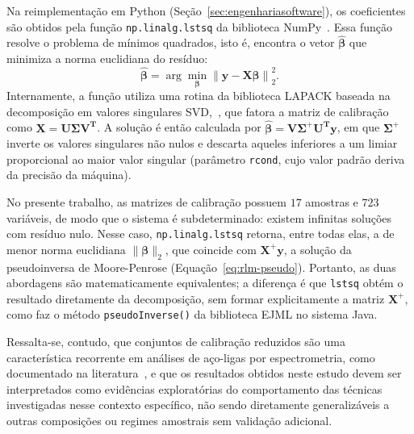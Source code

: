 Na reimplementação em Python (Seção~\ref{sec:engenhariasoftware}), os coeficientes são obtidos pela função \texttt{np.linalg.lstsq} da biblioteca NumPy~\cite{harris2020numpy,numpy_lstsq}. Essa função resolve o problema de mínimos quadrados, isto é, encontra o vetor $\widehat{\boldsymbol{\beta}}$ que minimiza a norma euclidiana do resíduo:
\begin{equation}
    \label{eq:lstsq-min}
    \widehat{\boldsymbol{\beta}} = \arg\min_{\boldsymbol{\beta}}
    \left\lVert \mathbf{y} - \mathbf{X}\boldsymbol{\beta} \right\rVert_2^2 .
\end{equation}
Internamente, a função utiliza uma rotina da biblioteca LAPACK baseada na
decomposição em valores singulares \gls{SVD},~\cite{anderson1999lapack,numpy_lstsq}, que fatora a matriz de calibração
como $\mathbf{X} = \mathbf{U}\boldsymbol{\Sigma}\mathbf{V}^{\mathbf{T}}$. A
solução é então calculada por
$\widehat{\boldsymbol{\beta}} = \mathbf{V}\boldsymbol{\Sigma}^{+}\mathbf{U}^{\mathbf{T}}\mathbf{y}$,
em que $\boldsymbol{\Sigma}^{+}$ inverte os valores singulares não nulos e
descarta aqueles inferiores a um limiar proporcional ao maior valor singular
(parâmetro \texttt{rcond}, cujo valor padrão deriva da precisão da máquina).

No presente trabalho, as matrizes de calibração possuem $17$ amostras e $723$
variáveis, de modo que o sistema é subdeterminado: existem infinitas soluções
com resíduo nulo. Nesse caso, \texttt{np.linalg.lstsq} retorna, entre todas
elas, a de menor norma euclidiana $\lVert\boldsymbol{\beta}\rVert_2$, que
coincide com $\mathbf{X}^{+}\mathbf{y}$, a solução da pseudoinversa de
Moore-Penrose (Equação~\ref{eq:rlm-pseudo}). Portanto, as duas abordagens são
matematicamente equivalentes; a diferença é que \texttt{lstsq} obtém o
resultado diretamente da decomposição, sem formar explicitamente a matriz
$\mathbf{X}^{+}$, como faz o método \texttt{pseudoInverse()} da biblioteca
EJML no sistema Java.



Ressalta-se, contudo, que conjuntos de calibração reduzidos são uma característica recorrente em análises de aço-ligas por espectrometria, como documentado na literatura~\cite{PIMENTEL:1998,KRAMER:1998}, e que os resultados obtidos neste estudo devem ser interpretados como evidências exploratórias do comportamento das técnicas investigadas nesse contexto específico, não sendo diretamente generalizáveis a outras composições ou regimes amostrais sem validação adicional.

